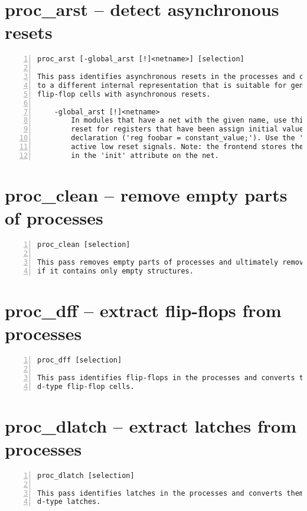\section{proc\_arst -- detect asynchronous resets}
\label{cmd:proc_arst}
\begin{lstlisting}[numbers=left,frame=single]
    proc_arst [-global_arst [!]<netname>] [selection]

This pass identifies asynchronous resets in the processes and converts them
to a different internal representation that is suitable for generating
flip-flop cells with asynchronous resets.

    -global_arst [!]<netname>
        In modules that have a net with the given name, use this net as async
        reset for registers that have been assign initial values in their
        declaration ('reg foobar = constant_value;'). Use the '!' modifier for
        active low reset signals. Note: the frontend stores the default value
        in the 'init' attribute on the net.
\end{lstlisting}

\section{proc\_clean -- remove empty parts of processes}
\label{cmd:proc_clean}
\begin{lstlisting}[numbers=left,frame=single]
    proc_clean [selection]

This pass removes empty parts of processes and ultimately removes a process
if it contains only empty structures.
\end{lstlisting}

\section{proc\_dff -- extract flip-flops from processes}
\label{cmd:proc_dff}
\begin{lstlisting}[numbers=left,frame=single]
    proc_dff [selection]

This pass identifies flip-flops in the processes and converts them to
d-type flip-flop cells.
\end{lstlisting}

\section{proc\_dlatch -- extract latches from processes}
\label{cmd:proc_dlatch}
\begin{lstlisting}[numbers=left,frame=single]
    proc_dlatch [selection]

This pass identifies latches in the processes and converts them to
d-type latches.
\end{lstlisting}

